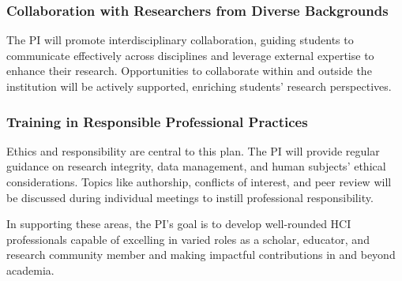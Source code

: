 \subsubsection*{Collaboration with Researchers from Diverse Backgrounds} The PI will promote interdisciplinary collaboration, guiding students to communicate effectively across disciplines and leverage external expertise to enhance their research. Opportunities to collaborate within and outside the institution will be actively supported, enriching students’ research perspectives.

\subsubsection*{Training in Responsible Professional Practices} Ethics and responsibility are central to this plan. The PI will provide regular guidance on research integrity, data management, and human subjects' ethical considerations. Topics like authorship, conflicts of interest, and peer review will be discussed during individual meetings to instill professional responsibility.

In supporting these areas, the PI’s goal is to develop well-rounded HCI professionals capable of excelling in varied roles as a scholar, educator, and research community member and making impactful contributions in and beyond academia.